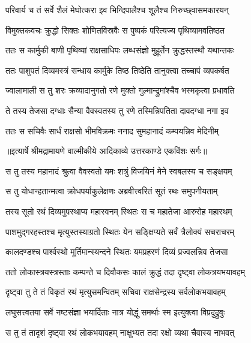 \twolineshloka
{परिवार्य च तं सर्वे शैलं मेघोत्करा इव}
{भिन्दिपालैश्च शूलैश्च निरुच्छ्वासमकारयन्} %

\twolineshloka
{विमुक्तकवचः क्रुद्धो सिक्तः शोणितविस्रवैः}
{स पुष्पकं परित्यज्य पृथिव्यामवतिष्ठत} %

\twolineshloka
{ततः स कार्मुकी बाणी पृथिव्यां राक्षसाधिपः}
{लब्धसंज्ञो मुहूर्तेन क्रुद्धस्तस्थौ यथान्तकः} %

\twolineshloka
{ततः पाशुपतं दिव्यमस्त्रं सन्धाय कार्मुके}
{तिष्ठ तिष्ठेति तानुक्त्वा तच्चापं व्यपकर्षत} %

\twolineshloka
{ज्वालामाली स तु शरः क्रव्यादानुगतो रणे}
{मुक्तो गुल्मान्द्रुमांश्चैव भस्मकृत्वा प्रधावति} %

\twolineshloka
{ते तस्य तेजसा दग्धाः सैन्या वैवस्वतस्य तु}
{रणे तस्मिन्निपतिता दावदग्धा नगा इव} %

\twolineshloka
{ततः स सचिवैः सार्धं राक्षसो भीमविक्रमः}
{ननाद सुमहानादं कम्पयन्निव मेदिनीम्} %


{॥इत्यार्षे श्रीमद्रामायणे वाल्मीकीये आदिकाव्ये उत्तरकाण्डे एकविंशः सर्गः॥}


\twolineshloka
{स तु तस्य महानादं श्रुत्वा वैवस्वतो यमः}
{शत्रुं विजयिनं मेने स्वबलस्य च सङ्क्षयम्} %

\twolineshloka
{स तु योधान्हतान्मत्वा क्रोधपर्याकुलेक्षणः}
{अब्रवीत्त्वरितं सूतं रथः समुपनीयताम्} %

\twolineshloka
{तस्य सूतो रथं दिव्यमुपस्थाप्य महास्वनम्}
{स्थितः स च महातेजा आरुरोह महारथम्} %

\twolineshloka
{पाशमुद्गरहस्तश्च मृत्युस्तस्याग्रतो स्थितः}
{येन सङ्क्षिप्यते सर्वं त्रैलोक्यं सचराचरम्} %

\twolineshloka
{कालदण्डश्च पार्श्वस्थो मूर्तिमान्स्यन्दने स्थितः}
{यमप्रहरणं दिव्यं प्रज्वलन्निव तेजसा} %

\twolineshloka
{ततो लोकास्त्रयस्त्रस्ताः कम्पन्ते च दिवौकसः}
{कालं क्रुद्धं तदा दृष्ट्वा लोकत्रयभयावहम्} %

\twolineshloka
{दृष्ट्वा तु ते तं विकृतं रथं मृत्युसमन्वितम्}
{सचिवा राक्षसेन्द्रस्य सर्वलोकभयावहम्} %

\twolineshloka
{लघुसत्त्वतया सर्वे नष्टसंज्ञा भयार्दिताः}
{नात्र योद्धुं समर्थाः स्म इत्युक्त्वा विप्रदुद्रुवुः} %

\twolineshloka
{स तु तं तादृशं दृष्ट्वा रथं लोकभयावहम्}
{नाक्षुभ्यत तदा रक्षो व्यथा चैवास्य नाभवत्} %

